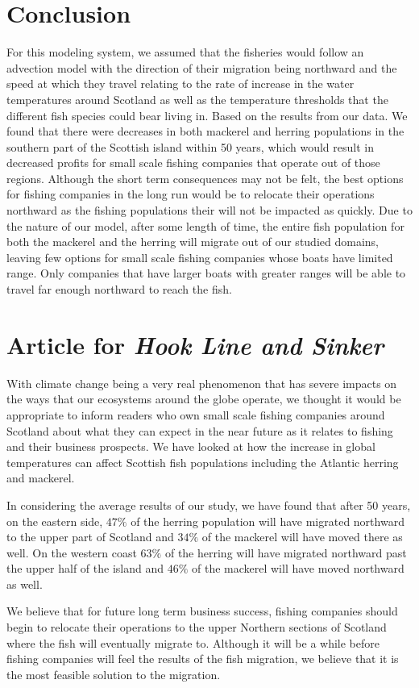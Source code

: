 \documentclass[12pt]{article}
\begin{document}
\section{Conclusion}
For this modeling system, we assumed that the fisheries would follow an advection model with the direction of their migration  being northward and the speed at which they travel relating to the rate of increase in the water temperatures around Scotland as well as the temperature thresholds that the different fish species could bear living in. 
Based on the results from our data. We found that there were decreases in both mackerel and herring populations in the southern part of the Scottish island within 50 years, which would result in decreased profits for small scale fishing companies that operate out of those regions. Although the short term consequences may not be felt, the best options for fishing companies in the long run would be to relocate their operations northward as the fishing populations their will not be impacted as quickly. 
Due to the nature of our model, after some length of time, the entire fish population for both the mackerel and the herring will migrate out of our studied domains, leaving few options for small scale fishing companies whose boats have limited range. Only companies that have larger boats with greater ranges will be able to travel far enough northward to reach the fish.  


\newpage
\section{Article for \emph{Hook Line and Sinker}}
With climate change being a very real phenomenon that has severe impacts on the ways that our ecosystems around the globe operate, we thought it would be appropriate to inform readers who own small  scale fishing companies around Scotland about what they can expect in the near future as it relates to fishing and their business prospects. We have looked at how the increase in global temperatures can affect Scottish fish populations including the Atlantic herring and mackerel.

In considering the average results of our study, we have found that after 50 years, on the eastern side, $47\%$ of the herring population will have migrated northward to the upper part of Scotland and $34\%$ of the mackerel will have moved there as well. On the western coast $63\%$ of the herring will have migrated northward past the upper half of the island and $46\%$ of the mackerel will have moved northward as well. 

We believe that for future long term business success, fishing companies should begin to relocate their operations to the upper Northern sections of Scotland where the fish will eventually migrate to. Although it will be a while before fishing companies will feel the results of the fish migration, we believe that it is the most feasible solution to the migration. 

   
\newpage
\printbibliography[heading=bibintoc]
\end{document}
